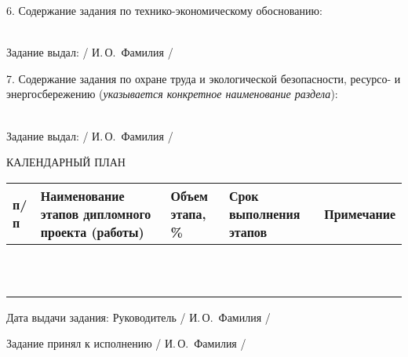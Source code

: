{  \vspace{1em}

  6. Содержание задания по технико-экономическому обоснованию:
  \lineunderscore\\
  \lineunderscore\\
  \lineunderscore

  Задание выдал: \hfill{} \uline{\hspace*{6em}} / И.\,О.~Фамилия /

  \vspace{1em}

  7. Содержание задания по охране труда и экологической безопасности, ресурсо- и энергосбережению (\textit{указывается конкретное наименование раздела}):
  \lineunderscore\\
  \lineunderscore\\
  \lineunderscore

  Задание выдал:  \hfill{} \uline{\hspace*{6em}} / И.\,О.~Фамилия /

  \vfill

  \begin{center}
    КАЛЕНДАРНЫЙ ПЛАН
  \end{center}

  \begin{tabular}{| >{\centering}m{}
                  | >{\centering}m{}
                  | >{\centering}m{}
                  | >{\centering}m{}
                  | >{\centering\arraybackslash}m{}|}
    \hline \No{} \No{} п/п & Наименование этапов дипломного проекта (работы) & Объем этапа, \% & Срок выполнения этапов & Примечание \\
    \hline & & & & \\
    \hline & & & & \\
    \hline & & & & \\
    \hline & & & & \\
    \hline & & & & \\
    \hline & & & & \\
    \hline & & & & \\
    \hline & & & & \\
    \hline & & & & \\
    \hline & & & & \\
    \hline & & & & \\
    \hline
  \end{tabular}

  \vspace{2em}

  Дата выдачи задания: \uline{\hspace*{6em}} \hspace{2ex} Руководитель \hfill{} \uline{\hspace*{4em}} / И.\,О.~Фамилия /

  \vspace{1em}

  Задание принял к исполнению \hfill{} \uline{\hspace*{4em}} / И.\,О.~Фамилия /

  \restoregeometry
}
